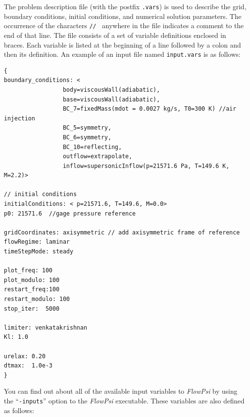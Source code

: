 \documentclass{article}
\begin{document}
The problem description file (with the postfix {\tt .vars}) is used to
describe the grid, boundary conditions, initial conditions, and
numerical solution parameters.  The occurrence of the characters {\tt // }
anywhere in the file indicates a comment to the end of that line.  The
file consists of a set of variable definitions enclosed in braces.
Each variable is listed at the beginning of a line followed by a colon
and then its definition.  An example of an input file
named {\tt input.vars} is as follows:
\begin{verbatim}
{
boundary_conditions: <
                 body=viscousWall(adiabatic),
                 base=viscousWall(adiabatic),
                 BC_7=fixedMass(mdot = 0.0027 kg/s, T0=300 K) //air injection
                 BC_5=symmetry,
                 BC_6=symmetry,
                 BC_10=reflecting,
                 outflow=extrapolate,
                 inflow=supersonicInflow(p=21571.6 Pa, T=149.6 K, M=2.2)>

// initial conditions
initialConditions: < p=21571.6, T=149.6, M=0.0>
p0: 21571.6  //gage pressure reference

gridCoordinates: axisymmetric // add axisymmetric frame of reference
flowRegime: laminar
timeStepMode: steady 

plot_freq: 100
plot_modulo: 100
restart_freq:100
restart_modulo: 100
stop_iter:  5000

limiter: venkatakrishnan
Kl: 1.0

urelax: 0.20
dtmax:  1.0e-3
}
\end{verbatim} 

You can find out about all of the available input variables to {\em FlowPsi}
by using the ``{\tt -inputs}'' option to the {\em FlowPsi} executable.
These variables are also defined as follows:
\end{document}
